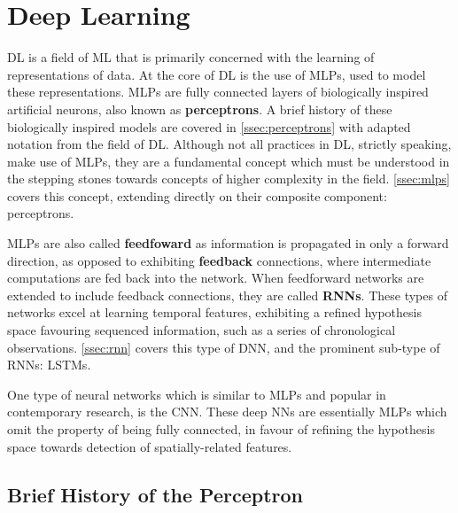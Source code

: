 \section{Deep Learning\label{sec:DL}}
\Gls{DL} is a field of \gls{ML} that is primarily concerned with the learning of
representations of data. At the core of \gls{DL} is the use of \glspl{MLP}, used
to model these representations. \Glspl{MLP} are fully connected layers of
biologically inspired artificial neurons, also known as \textbf{perceptrons}. A
brief history of these biologically inspired models are covered in
\autoref{ssec:perceptrons} with adapted notation from the field of \gls{DL}.
Although not all practices in \gls{DL}, strictly speaking, make use of
\glspl{MLP}, they are a fundamental concept which must be understood in the
stepping stones towards concepts of higher complexity in the field.
\autoref{ssec:mlps} covers this concept, extending directly on their composite
component: perceptrons.

\Glspl{MLP} are also called \textbf{feedfoward} as information is propagated in
only a forward direction, as opposed to exhibiting \textbf{feedback} connections,
where intermediate computations are fed back into the network. When feedforward
networks are extended to include feedback connections, they are called
\textbf{\glspl{RNN}}. These types of networks excel at learning temporal
features, exhibiting a refined hypothesis space favouring sequenced information,
such as a series of chronological observations. \autoref{ssec:rnn} covers this
type of \gls{DNN}, and the prominent sub-type of \glspl{RNN}: \glspl{LSTM}.

One type of neural networks which is similar to \glspl{MLP} and popular in
contemporary research, is the \gls{CNN}. These deep \glspl{NN} are essentially
\glspl{MLP} which omit the property of being fully connected, in favour of
refining the hypothesis space towards detection of spatially-related features.


\subsection{Brief History of the Perceptron\label{ssec:perceptrons}}

